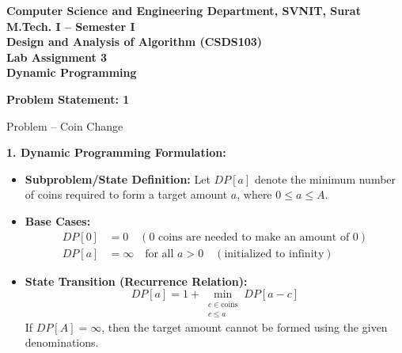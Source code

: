 \documentclass[12pt]{article}
\begin{document}

\begin{center}
\textbf{Computer Science and Engineering Department, SVNIT, Surat}\\
\textbf{M.Tech. I -- Semester I}\\
\textbf{Design and Analysis of Algorithm (CSDS103)}\\
\textbf{Lab Assignment 3}\\
\textbf{Dynamic Programming}
\end{center}

\vspace{0.3cm}


\textbf{Problem Statement: 1}

Problem -- Coin Change

\vspace{0.2cm}

\textbf{1. Dynamic Programming Formulation:}
\begin{itemize}
    \item \textbf{Subproblem/State Definition:} Let $DP[a]$ denote the minimum number of coins required to form a target amount $a$, where $0 \le a \le A$.
    \item \textbf{Base Cases:}
    \begin{align*}
        DP[0] &= 0 \quad (\text{0 coins are needed to make an amount of 0}) \\
        DP[a] &= \infty \quad \text{for all } a > 0 \quad (\text{initialized to infinity})
    \end{align*}
    \item \textbf{State Transition (Recurrence Relation):}
    \begin{equation*}
        DP[a] = 1 + \min_{\substack{c \in \text{coins} \\ c \le a}} DP[a - c]
    \end{equation*}
    If $DP[A] = \infty$, then the target amount cannot be formed using the given denominations.
\end{itemize}

\vspace{0.2cm}
\end{document}
